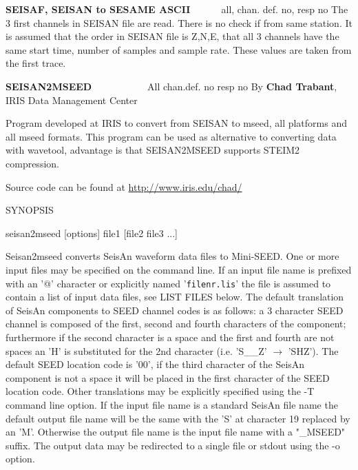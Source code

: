 \textbf{SEISAF, SEISAN to SESAME ASCII} \verb|     | 
 all, chan. def. no, resp no  \newline
The 3 first channels in SEISAN file are read. There is no check if from same station. It is assumed that the order in SEISAN file is Z,N,E, that all 3 channels have the same start time, number of samples and sample rate. These values are taken from the first trace. 

\textbf{SEISAN2MSEED} \verb|          | All chan.def. no resp no\newline
{} 
By \textbf{Chad Trabant}, IRIS Data Management Center

Program developed at IRIS to convert from SEISAN to mseed, all platforms and all mseed formats. This program can be used as alternative to converting data with wavetool, advantage is that SEISAN2MSEED supports STEIM2 compression.

Source code can be found at \url{http://www.iris.edu/chad/} 

SYNOPSIS 

seisan2mseed [options] file1 [file2 file3 ...] 

Seisan2mseed converts SeisAn waveform data files to Mini-SEED. One or more input files may be specified on the command line. If an input file name is prefixed with an '@' character or explicitly named '\texttt{filenr.lis}' the file is assumed to contain a list of input data files, see LIST FILES below. The default translation of SeisAn components to SEED channel codes is as follows: a 3 character SEED channel is composed of the first, second and fourth characters of the component; furthermore if the second character is a space and the first and fourth are not spaces an 'H' is substituted for the 2nd character (i.e. 'S\_\_Z' $\to$ 'SHZ'). The default SEED location code is '00', if the third character of the SeisAn component is not a space it will be placed in the first character of the SEED location code. Other translations may be explicitly specified using the -T command line option. If the input file name is a standard SeisAn file name the default output file name will be the same with the 'S' at character 19 replaced by an 'M'. Otherwise the output file name is the input file name with a "\_MSEED" suffix. The output data may be redirected to a single file or stdout using the -o option. 

